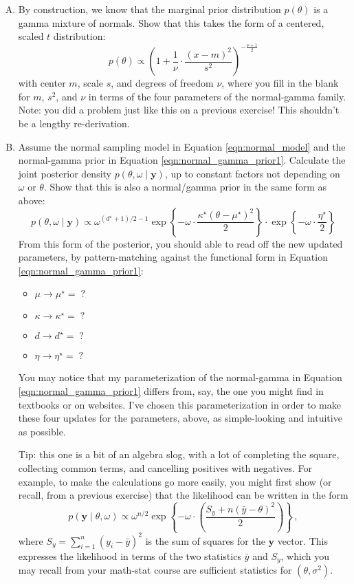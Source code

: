 \documentclass[11pt]{article}
\newcommand{\by}{\textbf{y}}
\begin{document}
\begin{enumerate}[(A)]


\item By construction, we know that the marginal prior distribution $p(\theta)$ is a gamma mixture of normals.  Show that this takes the form of a centered, scaled $t$ distribution: 
$$
p(\theta) \propto \left(1+ \frac{1}{\nu} \cdot \frac{(x - m)^2}{s^2}  \right)^{-\frac{\nu+1}{2}}
$$
with center $m$,  scale $s$, and degrees of freedom $\nu$, where you fill in the blank for $m$, $s^2$, and $\nu$ in terms of the four parameters of the normal-gamma family.  Note: you did a problem just like this on a previous exercise!  This shouldn't be a lengthy re-derivation.


\item Assume the normal sampling model in Equation \ref{eqn:normal_model} and the normal-gamma prior in Equation \ref{eqn:normal_gamma_prior1}.  Calculate the joint posterior density $p(\theta, \omega \mid \textbf{y})$, up to constant factors not depending on $\omega$ or $\theta$.  Show that this is also a normal/gamma prior in the same form as above:
\begin{equation}
\label{eqn:normal_gamma_post}
p(\theta, \omega \mid \by) \propto \omega^{(d^\star+1)/2 - 1} \exp \left\{ - \omega \cdot \frac{\kappa^\star (\theta - \mu^\star)^2}{2}  \right\}
\cdot \exp\left\{ -  \omega \cdot \frac{\eta^\star}{2}  \right\} 
\end{equation}
From this form of the posterior, you should able to read off the new updated parameters, by pattern-matching against the functional form in Equation \ref{eqn:normal_gamma_prior1}:
\begin{itemize}
\item $\mu \longrightarrow \mu^\star =  \; ?$
\item $\kappa \longrightarrow \kappa^\star =  \; ?$
\item $d \longrightarrow d^{\star} =  \; ?$
\item $\eta \longrightarrow \eta^\star = \; ?$
\end{itemize}
You may notice that my parameterization of the normal-gamma in Equation \ref{eqn:normal_gamma_prior1} differs from, say, the one you might find in textbooks or on websites.  I've chosen this parameterization in order to make these four updates for the parameters, above, as simple-looking and intuitive as possible.


Tip: this one is a bit of an algebra slog, with a lot of completing the square, collecting common terms, and cancelling positives with negatives.  For example, to make the calculations go more easily, you might first show (or recall, from a previous exercise) that the likelihood can be written in the form
$$
p(\by \mid \theta, \omega) \propto \omega^{n/2} \exp \left\{ - \omega \cdot \left( \frac{S_y + n(\bar{y} - \theta)^2}{2} \right) \right\} \, ,
$$
where $S_y = \sum_{i=1}^n (y_i - \bar{y})^2$ is the sum of squares for the $\by$ vector.  This expresses the likelihood in terms of the two statistics $\bar{y}$ and $S_y$, which you may recall from your math-stat course are sufficient statistics for $(\theta, \sigma^2)$.


\end{enumerate}
\end{document}
